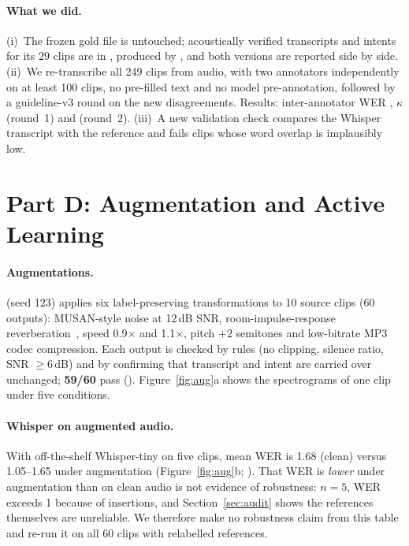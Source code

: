 \documentclass[sigconf,authordraft]{acmart}
\begin{document}
\paragraph{What we did.}
(i)~The frozen gold file is untouched; acoustically verified transcripts and intents for its 29 clips are in , produced by , and both versions are reported side by side. (ii)~We re-transcribe all 249 clips from audio, with two annotators independently on at least 100 clips, no pre-filled text and no model pre-annotation, followed by a guideline-v3 round on the new disagreements. Results: inter-annotator WER \RelabWER{}, $\kappa$ \RelabKapOne{} (round~1) and \RelabKapTwo{} (round~2). (iii)~A new validation check compares the Whisper transcript with the reference and fails clips whose word overlap is implausibly low.

\section{Part D: Augmentation and Active Learning}\label{sec:aug}
\paragraph{Augmentations.}
 (seed 123) applies six label-preserving transformations to 10 source clips (60 outputs): MUSAN-style noise at 12\,dB SNR, room-impulse-response reverberation~\cite{Ko2017}, speed 0.9$\times$ and 1.1$\times$, pitch $+2$ semitones and low-bitrate MP3 codec compression. Each output is checked by rules (no clipping, silence ratio, SNR $\ge6$\,dB) and by confirming that transcript and intent are carried over unchanged; \textbf{59/60} pass (). Figure~\ref{fig:aug}a shows the spectrograms of one clip under five conditions.

\paragraph{Whisper on augmented audio.}
With off-the-shelf Whisper-tiny on five clips, mean WER is 1.68 (clean) versus 1.05--1.65 under augmentation (Figure~\ref{fig:aug}b; ). That WER is \emph{lower} under augmentation than on clean audio is not evidence of robustness: $n=5$, WER exceeds 1 because of insertions, and Section~\ref{sec:audit} shows the references themselves are unreliable. We therefore make no robustness claim from this table and re-run it on all 60 clips with relabelled references.
\end{document}
